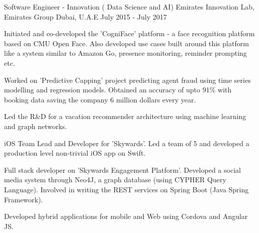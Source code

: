 \begin{cventries}
  \cventry
    {Software Engineer - Innovation ( Data Science and AI)} %
    {Emirates Innovation Lab, Emirates Group} %
    {Dubai, U.A.E} %
    {July 2015 - July 2017} %
    {
      \begin{cvitems} %
        \item {Initiated and co-developed the 'CogniFace' platform - a face recognition platform based on CMU Open Face. Also developed use cases built around this platform like a system similar to Amazon Go, presence monitoring, reminder prompting etc. }
        \item {Worked on 'Predictive Capping' project predicting agent fraud using time series modelling and regression models. Obtained an accuracy of upto 91\% with booking data saving the company 6 million dollars every year.}
        \item {Led the R\&D for a vacation recommender architecture using machine learning and graph networks.}
        \item {iOS Team Lead and Developer for 'Skywards'. Led a team of 5 and developed a production level non-trivial iOS app on Swift.}
        \item {Full stack developer on 'Skywards Engagement Platform'. Developed a social media system through Neo4J, a graph
database (using CYPHER Query Language). Involved in writing the REST services on Spring Boot (Java Spring Framework).}
        \item {Developed hybrid applications for mobile and Web using Cordova and Angular JS.}
      \end{cvitems}
    }
\end{cventries}

